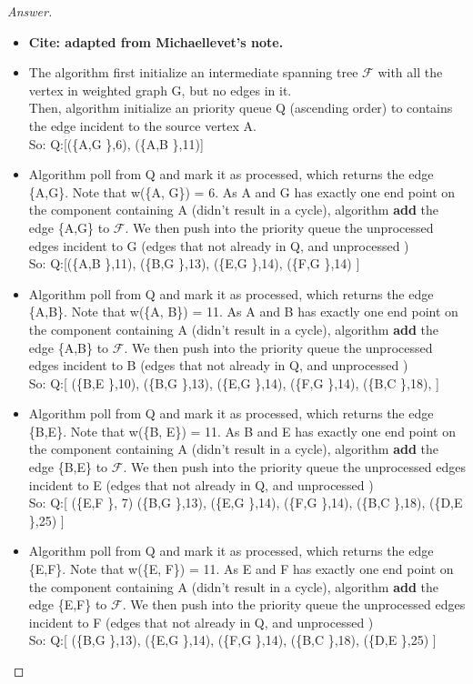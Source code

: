 \documentclass[11pt]{article}
\theoremstyle{definition}
\theoremstyle{definition}
\theoremstyle{definition}
\begin{document}
\begin{proof}[Answer]
\begin{itemize}
\item \textbf{Cite: adapted from Michaellevet's note.}
\item The algorithm first initialize an intermediate spanning tree $\mathcal{F}$  with all the vertex in weighted graph G, but no edges in it. \\
Then, algorithm initialize an priority queue Q (ascending order) to contains the edge incident to the source vertex A.\\
So: Q:[(\{A,G \},6), (\{A,B \},11)]

\item Algorithm poll from Q and mark it as processed, which returns the edge \{A,G\}. Note that w(\{A, G\}) = 6. As A and G has exactly one end point on the component containing A (didn't result in a cycle), algorithm \textbf{add} the edge \{A,G\}  to $\mathcal{F}$. We then push into the priority queue the unprocessed edges incident to G (edges that not already in Q, and unprocessed )\\
So:  Q:[(\{A,B \},11), (\{B,G \},13), (\{E,G \},14), (\{F,G \},14) ]

\item Algorithm poll from Q and mark it as processed, which returns the edge \{A,B\}. Note that w(\{A, B\}) = 11. As A and B has exactly one end point on the component containing A (didn't result in a cycle), algorithm \textbf{add} the edge \{A,B\} to $\mathcal{F}$. We then push into the priority queue the unprocessed edges incident to B (edges that not already in Q, and unprocessed )\\
So:  Q:[ (\{B,E \},10), (\{B,G \},13), (\{E,G \},14), (\{F,G \},14), (\{B,C \},18), ]

\item Algorithm poll from Q and mark it as processed, which returns the edge \{B,E\}. Note that w(\{B, E\}) = 11. As B and E has exactly one end point on the component containing A (didn't result in a cycle), algorithm \textbf{add} the edge \{B,E\}  to $\mathcal{F}$. We then push into the priority queue the unprocessed edges incident to E (edges that not already in Q, and unprocessed )\\
So:  Q:[ (\{E,F \}, 7) (\{B,G \},13), (\{E,G \},14), (\{F,G \},14), (\{B,C \},18), (\{D,E \},25) ]

\item Algorithm poll from Q and mark it as processed, which returns the edge \{E,F\}. Note that w(\{E, F\}) = 11. As E and F has exactly one end point on the component containing A (didn't result in a cycle), algorithm \textbf{add} the edge \{E,F\}  to $\mathcal{F}$. We then push into the priority queue the unprocessed edges incident to F (edges that not already in Q, and unprocessed )\\
So:  Q:[ (\{B,G \},13), (\{E,G \},14), (\{F,G \},14), (\{B,C \},18), (\{D,E \},25) ]


\end{itemize}
\end{proof}
\end{document}
